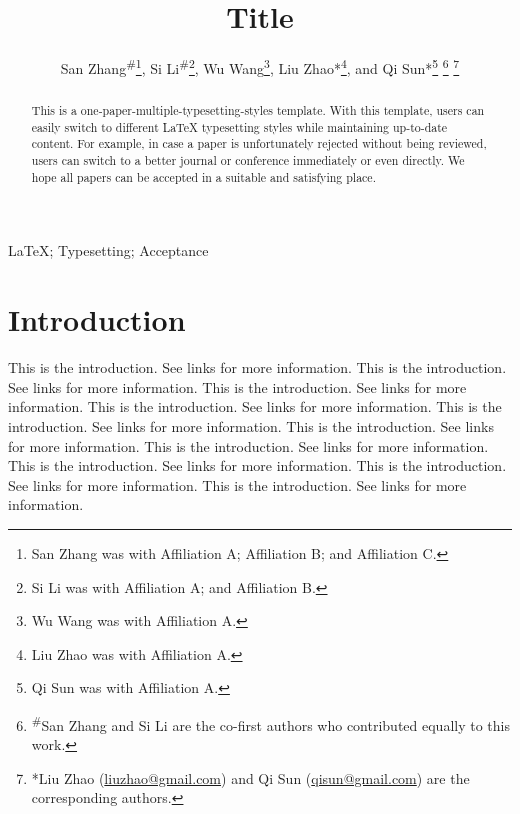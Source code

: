 \documentclass[lettersize,journal]{IEEEtran}
\begin{document}
\title{Title}

\author{
	San Zhang\textsuperscript{\#}\thanks{San Zhang was with Affiliation A; Affiliation B; and Affiliation C. }, 
	Si Li\textsuperscript{\#}\thanks{Si Li was with Affiliation A; and Affiliation B. }, 
	Wu Wang\thanks{Wu Wang was with Affiliation A. }, 
	Liu Zhao*\thanks{Liu Zhao was with Affiliation A. }, 
	and Qi Sun*\thanks{Qi Sun was with Affiliation A. }
	\thanks{\textsuperscript{\#}San Zhang and Si Li are the co-first authors who contributed equally to this work. }
	\thanks{*Liu Zhao (\protect\url{liuzhao@gmail.com}) and Qi Sun (\protect\url{qisun@gmail.com}) are the corresponding authors. }
}

\maketitle

\begin{abstract}
	This is a one-paper-multiple-typesetting-styles template. With this template, users can easily switch to different LaTeX typesetting styles while maintaining up-to-date content. For example, in case a paper is unfortunately rejected without being reviewed, users can switch to a better journal or conference immediately or even directly. We hope all papers can be accepted in a suitable and satisfying place. 
\end{abstract}

\begin{IEEEkeywords}
	LaTeX; Typesetting; Acceptance
\end{IEEEkeywords}

\section{Introduction}
\label{sec:1}

This is the introduction. See links \cite{liu2024efficient, yang2026builder, yang2025checker} for more information. This is the introduction. See links \cite{liu2024efficient, yang2026builder, yang2025checker} for more information. This is the introduction. See links \cite{liu2024efficient, yang2026builder, yang2025checker} for more information. This is the introduction. See links \cite{liu2024efficient, yang2026builder, yang2025checker} for more information. This is the introduction. See links \cite{liu2024efficient, yang2026builder, yang2025checker} for more information. This is the introduction. See links \cite{liu2024efficient, yang2026builder, yang2025checker} for more information. This is the introduction. See links \cite{liu2024efficient, yang2026builder, yang2025checker} for more information. This is the introduction. See links \cite{liu2024efficient, yang2026builder, yang2025checker} for more information. This is the introduction. See links \cite{liu2024efficient, yang2026builder, yang2025checker} for more information. This is the introduction. See links \cite{liu2024efficient, yang2026builder, yang2025checker} for more information. 
\end{document}
